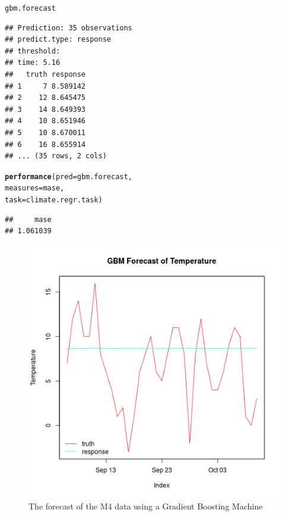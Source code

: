 \documentclass[12pt]{article}\usepackage[]{graphicx}\usepackage[]{color}
\makeatletter
\newcommand{\hlstd}[1]{\textcolor[rgb]{0.345,0.345,0.345}{#1}}%
\newcommand{\hlkwc}[1]{\textcolor[rgb]{0.333,0.667,0.333}{#1}}%
\newcommand{\hlkwd}[1]{\textcolor[rgb]{0.737,0.353,0.396}{\textbf{#1}}}%
\newenvironment{kframe}{%
 \def\at@end@of@kframe{}%
 \ifinner\ifhmode%
  \def\at@end@of@kframe{\end{minipage}}%
  \begin{minipage}{\columnwidth}%
 \fi\fi%
 \def\FrameCommand##1{\hskip\@totalleftmargin \hskip-\fboxsep
 \colorbox{shadecolor}{##1}\hskip-\fboxsep
     \hskip-\linewidth \hskip-\@totalleftmargin \hskip\columnwidth}%
 \MakeFramed {\advance\hsize-\width
   \@totalleftmargin\z@ \linewidth\hsize
   \@setminipage}}%
 {\par\unskip\endMakeFramed%
 \at@end@of@kframe}
\newenvironment{knitrout}{}{} %
\theoremstyle{definition}
\makeatother
\begin{document}
\begin{knitrout}
\color{fgcolor}\begin{kframe}
\begin{alltt}
\hlstd{gbm.forecast}
\end{alltt}
\begin{verbatim}
## Prediction: 35 observations
## predict.type: response
## threshold: 
## time: 5.16
##   truth response
## 1     7 8.589142
## 2    12 8.645475
## 3    14 8.649393
## 4    10 8.651946
## 5    10 8.670011
## 6    16 8.655914
## ... (35 rows, 2 cols)
\end{verbatim}
\begin{alltt}
\hlkwd{performance}\hlstd{(}\hlkwc{pred} \hlstd{= gbm.forecast,}
            \hlkwc{measures} \hlstd{= mase,}
            \hlkwc{task} \hlstd{= climate.regr.task)}
\end{alltt}
\begin{verbatim}
##     mase 
## 1.061039
\end{verbatim}
\end{kframe}
\end{knitrout}

\doublespacing



\begin{figure}[h!]
\includegraphics[width=.8\linewidth]{plot_gbm_fore.png}
\centering
\caption{The forecast of the M4 data using a Gradient Boosting Machine}
\label{fig:gbm_final}
\end{figure}
\end{document}
